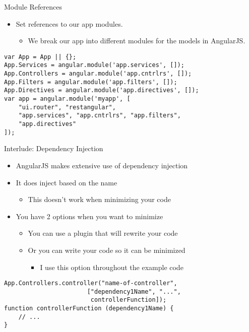 \documentclass[presentation]{beamer}
\begin{document}
\begin{frame}[fragile,label=sec-3-1]{Module References}
 \begin{itemize}
\item Set references to our app modules.
\begin{itemize}
\item We break our app into different modules for the models in AngularJS.
\end{itemize}
\end{itemize}
\begin{verbatim}
var App = App || {};
App.Services = angular.module('app.services', []);
App.Controllers = angular.module('app.cntrlrs', []);
App.Filters = angular.module('app.filters', []);
App.Directives = angular.module('app.directives', []);
var app = angular.module('myapp', [
    "ui.router", "restangular",
    "app.services", "app.cntrlrs", "app.filters",
    "app.directives"
]);
\end{verbatim}
\end{frame}

\begin{frame}[fragile,label=sec-3-2]{Interlude: Dependency Injection}
 \begin{itemize}
\item AngularJS makes extensive use of dependency injection
\item It does inject based on the name
\begin{itemize}
\item This doesn't work when minimizing your code
\end{itemize}
\item You have 2 options when you want to minimize
\begin{itemize}
\item You can use a plugin that will rewrite your code
\item Or you can write your code so it can be minimized
\begin{itemize}
\item I use this option throughout the example code
\end{itemize}
\end{itemize}
\end{itemize}
\begin{verbatim}
App.Controllers.controller("name-of-controller",
                       ["dependency1Name", "...",
                        controllerFunction]);
function controllerFunction (dependency1Name) {
    // ...
}
\end{verbatim}
\end{frame}
\end{document}
